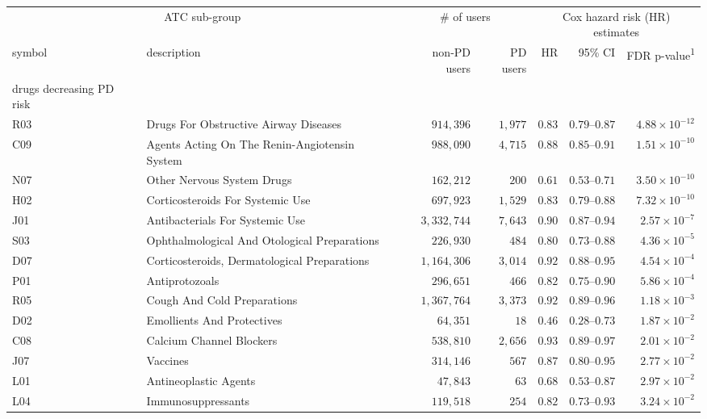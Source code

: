 \captionsetup[table]{labelformat=empty,skip=1pt}
\setlength{\LTpost}{0mm}
\begin{longtable}{llrrrrr}
\toprule
\multicolumn{2}{c}{ATC sub-group} & \multicolumn{2}{c}{\# of users} & \multicolumn{3}{c}{Cox hazard risk (HR) estimates} \\ 
\cmidrule(lr){1-2} \cmidrule(lr){3-4} \cmidrule(lr){5-7}
symbol & description & non-PD users & PD users & HR & 95\% CI & FDR p-value\textsuperscript{1} \\ 
\midrule
\multicolumn{1}{l}{drugs decreasing PD risk} \\ 
\midrule
R03 & Drugs For Obstructive Airway Diseases & $914,396$ & $1,977$ & $0.83$ & $0.79$–$0.87$ & $4.88 \times 10^{-12}$ \\ 
C09 & Agents Acting On The Renin-Angiotensin System & $988,090$ & $4,715$ & $0.88$ & $0.85$–$0.91$ & $1.51 \times 10^{-10}$ \\ 
N07 & Other Nervous System Drugs & $162,212$ & $200$ & $0.61$ & $0.53$–$0.71$ & $3.50 \times 10^{-10}$ \\ 
H02 & Corticosteroids For Systemic Use & $697,923$ & $1,529$ & $0.83$ & $0.79$–$0.88$ & $7.32 \times 10^{-10}$ \\ 
J01 & Antibacterials For Systemic Use & $3,332,744$ & $7,643$ & $0.90$ & $0.87$–$0.94$ & $2.57 \times 10^{-7}$ \\ 
S03 & Ophthalmological And Otological Preparations & $226,930$ & $484$ & $0.80$ & $0.73$–$0.88$ & $4.36 \times 10^{-5}$ \\ 
D07 & Corticosteroids, Dermatological Preparations & $1,164,306$ & $3,014$ & $0.92$ & $0.88$–$0.95$ & $4.54 \times 10^{-4}$ \\ 
P01 & Antiprotozoals & $296,651$ & $466$ & $0.82$ & $0.75$–$0.90$ & $5.86 \times 10^{-4}$ \\ 
R05 & Cough And Cold Preparations & $1,367,764$ & $3,373$ & $0.92$ & $0.89$–$0.96$ & $1.18 \times 10^{-3}$ \\ 
D02 & Emollients And Protectives & $64,351$ & $18$ & $0.46$ & $0.28$–$0.73$ & $1.87 \times 10^{-2}$ \\ 
C08 & Calcium Channel Blockers & $538,810$ & $2,656$ & $0.93$ & $0.89$–$0.97$ & $2.01 \times 10^{-2}$ \\ 
J07 & Vaccines & $314,146$ & $567$ & $0.87$ & $0.80$–$0.95$ & $2.77 \times 10^{-2}$ \\ 
L01 & Antineoplastic Agents & $47,843$ & $63$ & $0.68$ & $0.53$–$0.87$ & $2.97 \times 10^{-2}$ \\ 
L04 & Immunosuppressants & $119,518$ & $254$ & $0.82$ & $0.73$–$0.93$ & $3.24 \times 10^{-2}$ \\ 

\end{longtable}
